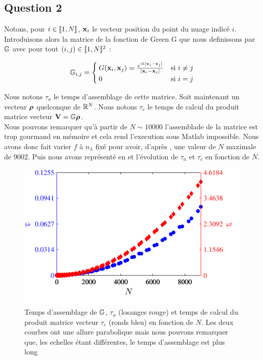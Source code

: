 \documentclass[10pt]{article}
\begin{document}
\begin{multicols}{2}
\vspace*{22pt}



\section*{Question 2}

Notons, pour $i \in  \llbracket 1,N \rrbracket $, ${\bf x}_i$ le vecteur position du point du nuage indicé $i$. Introduisons alors la matrice de la fonction de Green G que nous definissons par $\mathbb{G}$ avec pour tout $(i,j) \in  \llbracket 1,N \rrbracket ^{2}$ :

\begin{equation}
 \mathbb{G}_{i,j} =
 \begin{cases}
   G({\bf x}_i,{\bf x}_j) = \frac{e^{ik\left| {\bf x}_i - {\bf x}_j \right|}}{\left| {\bf x}_i - {\bf x}_j \right|} & \text{si } 
   i\neq j \\
   0 & \text{si } i=j
 \end{cases}
 \label{eq:green}
\end{equation}


Nous notons $\tau_{a}$ le temps d'assemblage de cette matrice. Soit maintenant un vecteur ${\boldsymbol{\rho}}$ quelconque de $\mathbb{R}^{N}$. Nous notons $\tau_c$ le temps de calcul du produit matrice vecteur ${\bf V} = \mathbb{G}{\boldsymbol{\rho}}$.\\

Nous pouvons remarquer qu'à partir de $N \sim 10 000$ l'assemblade de la matrice est trop gourmand en mémoire et cela rend l'execution sous Matlab impossible. Nous avons donc fait varier $f$ à $n_\lambda$ fixé pour avoir, d'après , une valeur de $N$ maximale de 9002. Puis nous avons représenté en  et  l'évolution de $\tau_a$ et $\tau_c$ en fonction de $N$.



\begin{figure}[H]
  \begin{center}
  \includegraphics[width=0.95\columnwidth]{Q2a_4.pdf}
  \vspace*{-11pt}
  \caption{Temps d'assemblage de $\mathbb{G}$, $\tau_a$ (losanges rouge) et temps de calcul du produit matrice vecteur $\tau_c$ (ronds bleu) en fonction de $N$. Les deux courbes ont une allure parabolique mais nous pouvons remarquer que, les echelles étant différentes, le temps d'assemblage est plus long}
  \label{fig:Q2a}
  \end{center}
\end{figure}
\vspace*{-30pt}


\end{multicols}
\end{document}
